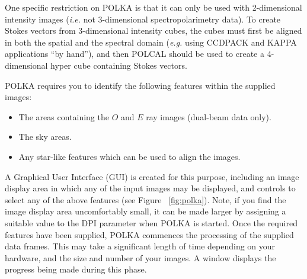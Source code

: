 \documentclass[twoside,11pt]{article}
\newcommand{\htmlref}[2]{#1}
\renewcommand{\_}{\texttt{\symbol{95}}}
\begin{document}
One specific restriction on POLKA is that it can only be used with
2-dimensional intensity images (\emph{i.e.} not 3-dimensional
spectropolarimetry data). To create Stokes vectors from 3-dimensional
intensity cubes, the cubes must first be aligned in both the spatial and
the spectral domain (\emph{e.g.} using CCDPACK and KAPPA applications
``by hand''), and then \htmlref{POLCAL}{POLCAL} should be used to create
a 4-dimensional hyper cube containing Stokes vectors.

POLKA requires you to identify the following features within the supplied
images:

\begin{itemize}
\item The areas containing the $O$ and $E$ ray images (dual-beam data only).
\item The sky areas.
\item Any star-like features which can be used to align the images.
\end{itemize}

A Graphical User Interface (GUI) is created for this purpose, including
an image display area in which any of the input images may be displayed,
and controls to select any of the above features (see Figure
~\ref{fig:polka}). Note, if you find the image display area uncomfortably
small, it can be made larger by assigning a suitable value to the DPI
parameter when POLKA is started. Once the required features have been
supplied, POLKA commences the processing of the supplied data frames.
This may take a significant length of time depending on your hardware,
and the size and number of your images. A window displays the progress
being made during this phase.
\end{document}
